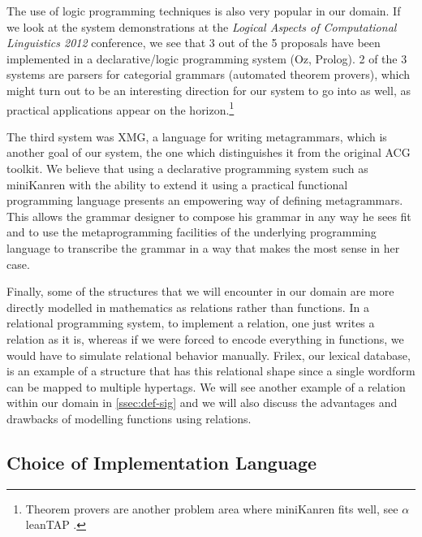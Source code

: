 The use of logic programming techniques is also very popular in our
domain. If we look at the system demonstrations at the \emph{Logical
  Aspects of Computational Linguistics 2012} conference, we see that 3
out of the 5 proposals have been implemented in a declarative/logic
programming system (Oz, Prolog). 2 of the 3 systems are parsers for
categorial grammars (automated theorem provers), which might turn out to
be an interesting direction for our system to go into as well, as
practical applications appear on the horizon.\footnote{Theorem provers
  are another problem area where miniKanren fits well, see
  $\alpha$leanTAP \cite{near2008alpha}.}

The third system was XMG, a language for writing metagrammars, which is
another goal of our system, the one which distinguishes it from the
original ACG toolkit. We believe that using a declarative programming
system such as miniKanren with the ability to extend it using a
practical functional programming language presents an empowering way of
defining metagrammars. This allows the grammar designer to compose his
grammar in any way he sees fit and to use the metaprogramming facilities
of the underlying programming language to transcribe the grammar in a
way that makes the most sense in her case.

Finally, some of the structures that we will encounter in our domain are
more directly modelled in mathematics as relations rather than
functions. In a relational programming system, to implement a relation,
one just writes a relation as it is, whereas if we were forced to encode
everything in functions, we would have to simulate relational behavior
manually. Frilex, our lexical database, is an example of a structure
that has this relational shape since a single wordform can be mapped to
multiple hypertags. We will see another example of a relation within our
domain in \ref{ssec:def-sig} and we will also discuss the advantages and
drawbacks of modelling functions using relations.

\subsection{Choice of Implementation Language}

